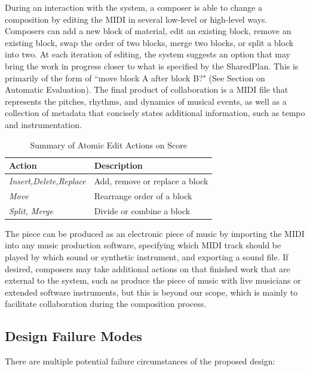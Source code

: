 \documentclass[final,authoryear,5p,times,twocolumn]{elsarticle}
\begin{document}
During an interaction with the system, a composer is able to change a composition by editing the MIDI in several low-level or high-level ways. Composers can add a new block of material, edit an existing block, remove an existing block, swap the order of two blocks, merge two blocks, or split a block into two. At each iteration of editing, the system suggests an option that may bring the work in progress closer to what is specified by the SharedPlan. This is primarily of the form of ``move block A after block B?" (See Section on Automatic Evaluation). The final product of collaboration is a MIDI file that represents the pitches, rhythms, and dynamics of musical events, as well as a collection of metadata that concisely states additional information, such as tempo and instrumentation. 

\begin{table}
    \begin{tabular}{|l|l|}
    	\hline
    	\textbf{Action} & \textbf{Description} \\
    	\hline
    	\textit{Insert,Delete,Replace} & Add, remove or replace a block \\
    	\textit{Move} & Rearrange order of a block \\
    	\textit{Split, Merge} & Divide or combine a block \\
    	\hline
    \end{tabular}
	\caption{Summary of Atomic Edit Actions on Score}
\end{table}

The piece can be produced as an electronic piece of music by importing the MIDI into any music production software, specifying which MIDI track should be played by which sound or synthetic instrument, and exporting a sound file. If desired, composers may take additional actions on that finished work that are external to the system, such as produce the piece of music with live musicians or extended software instruments, but this is beyond our scope, which is mainly to facilitate collaboration during the composition process.

\subsection{Design Failure Modes}

There are multiple potential failure circumstances of the proposed design:
\end{document}
